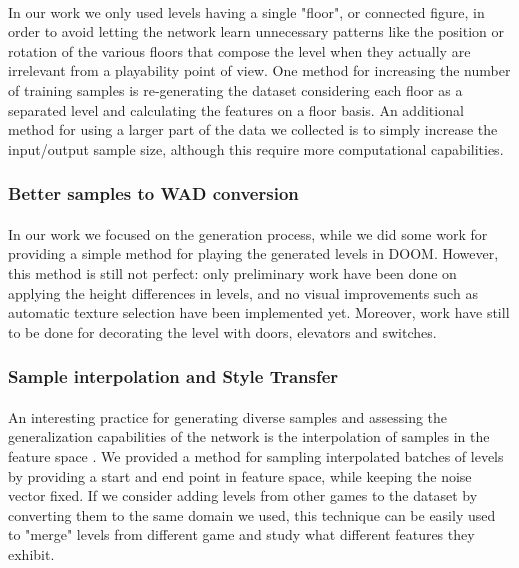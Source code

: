 \paragraph{} In our work we only used levels having a single "floor", or connected figure, in order to avoid letting the network learn unnecessary patterns like the position or rotation of the various floors that compose the level when they actually are irrelevant from a playability point of view. One method for increasing the number of training samples is re-generating the dataset considering each floor as a separated level and calculating the features on a floor basis. An additional method for using a larger part of the data we collected is to simply increase the input/output sample size, although this require more computational capabilities. 

\subsubsection{Better samples to WAD conversion}
\paragraph{} In our work we focused on the generation process, while we did some work for providing a simple method for playing the generated levels in DOOM. However, this method is still not perfect: only preliminary work have been done on applying the height differences in levels, and no visual improvements such as automatic texture selection have been implemented yet. Moreover, work have still to be done for decorating the level with doors, elevators and switches. 

 \subsubsection{Sample interpolation and Style Transfer}
\paragraph{} An interesting practice for generating diverse samples and assessing the generalization capabilities of the network is the interpolation of samples in the feature space \cite{slerp}. We provided a method for sampling interpolated batches of levels by providing a start and end point in feature space, while keeping the noise vector fixed. If we consider adding levels from other games to the dataset by converting them to the same domain we used, this technique can be easily used to "merge" levels from different game and study what different features they exhibit.

